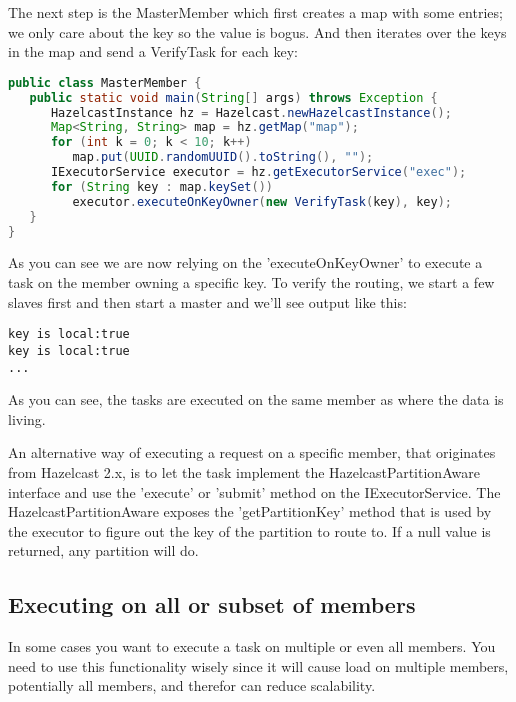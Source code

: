 The next step is the MasterMember which first creates a map with some entries; we only care about the key so the value is bogus. And then iterates over the keys in the map and send a VerifyTask for each key:
\begin{lstlisting}[language=java]
public class MasterMember {
   public static void main(String[] args) throws Exception {
      HazelcastInstance hz = Hazelcast.newHazelcastInstance();
      Map<String, String> map = hz.getMap("map");
      for (int k = 0; k < 10; k++)
         map.put(UUID.randomUUID().toString(), "");
      IExecutorService executor = hz.getExecutorService("exec");
      for (String key : map.keySet())
         executor.executeOnKeyOwner(new VerifyTask(key), key);
   }
}
\end{lstlisting}
As you can see we are now relying on the 'executeOnKeyOwner' to execute a task on the member owning a specific key. To verify the routing, we start a few slaves first and then start a master and we'll see output like this:
\begin{lstlisting}
key is local:true
key is local:true
...
\end{lstlisting}
As you can see, the tasks are executed on the same member as where the data is living.

An alternative way of executing a request on a specific member, that originates from Hazelcast 2.x, is to let the task implement the HazelcastPartitionAware interface and use the  'execute' or 'submit' method on the IExecutorService. The HazelcastPartitionAware exposes the 'getPartitionKey' method that is used by the executor to figure out the key of the partition to route to. If a null value is returned, any partition will do.

\subsection{Executing on all or subset of members}
In some cases you want to execute a task on multiple or even all members. You need to use this functionality wisely since it will cause load on multiple members, potentially all members, and therefor can reduce scalability.

